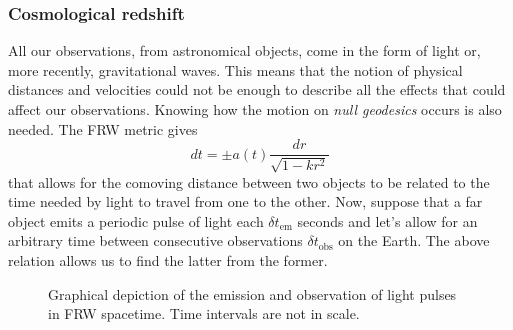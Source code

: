 \subsubsection{Cosmological redshift}
All our observations, from astronomical objects, come in the form of light or, more recently, gravitational waves. This means that the notion of physical distances and velocities could not be enough to describe all the effects that could affect our observations. Knowing how the motion on \emph{null geodesics} occurs is also needed. The FRW metric gives $$dt=\pm a(t)\frac{dr}{\sqrt{1-kr^2}}$$ that allows for the comoving distance between two objects to be related to the time needed by light to travel from one to the other. Now, suppose that a far object emits a periodic pulse of light each $\delta t_{\text{em}}$ seconds and let's allow for an arbitrary time between consecutive observations $\delta t_{\text{obs}}$ on the Earth. The above relation allows us to find the latter from the former.
\begin{figure}
    \centering
\caption{Graphical depiction of the emission and observation of light pulses in FRW spacetime. Time intervals are not in scale.\label{fig:redshift}}
\end{figure}
